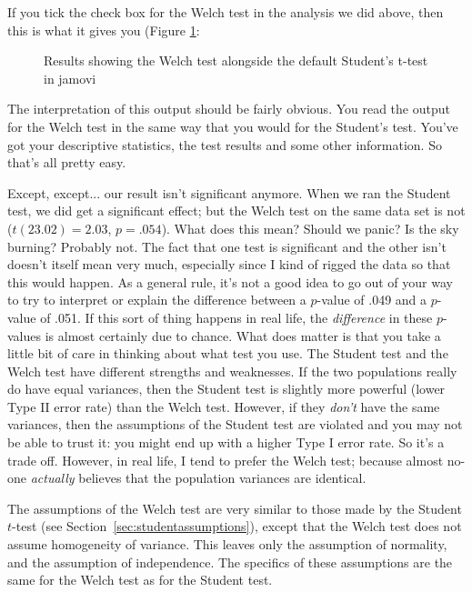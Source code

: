 
If you tick the check box for the Welch test in the analysis we did above, then this is what it gives you (Figure \ref{fig:ttest_welch}:

\begin{figure}[h!!]
\begin{center}
\caption{Results showing the Welch test alongside the default Student's t-test in jamovi}
\HR
\label{fig:ttest_welch}
\end{center}
\end{figure}

The interpretation of this output should be fairly obvious. You read the output for the Welch test in the same way that you would for the Student's test. You've got your descriptive statistics, the test results and some other information. So that's all pretty easy. 

Except, except... our result isn't significant anymore. When we ran the Student test, we did get a significant effect; but the Welch test on the same data set is not ($t(23.02) = 2.03$, $p = .054$). What does this mean? Should we panic? Is the sky burning? Probably not. The fact that one test is significant and the other isn't doesn't itself mean very much, especially since I kind of rigged the data so that this would happen. As a general rule, it's not a good idea to go out of your way to try to interpret or explain the difference between a $p$-value of .049 and a $p$-value of .051. If this sort of thing happens in real life, the {\it difference} in these $p$-values is almost certainly due to chance. What does matter is that you take a little bit of care in thinking about what test you use. The Student test and the Welch test have different strengths and weaknesses. If the two populations really do have equal variances, then the Student test is slightly more powerful (lower Type II error rate) than the Welch test. However, if they {\it don't} have the same variances, then the assumptions of the Student test are violated and you may not be able to trust it: you might end up with a higher Type I error rate. So it's a trade off. However, in real life, I tend to prefer the Welch test; because almost no-one {\it actually} believes that the population variances are identical.



The assumptions of the Welch test are very similar to those made by the Student $t$-test (see Section~\ref{sec:studentassumptions}), except that the Welch test does not assume homogeneity of variance. This leaves only the assumption of normality, and the assumption of independence. The specifics of these assumptions are the same for the Welch test as for the Student test. 

